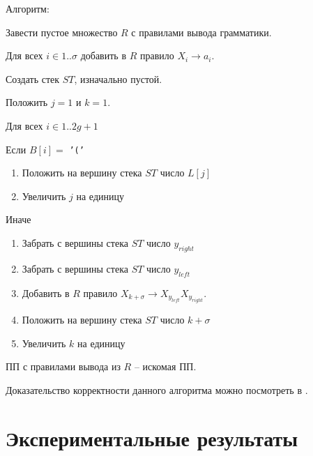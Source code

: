\documentclass[14pt]{article}
\begin{document}
{\sc Алгоритм:}
\begin{enumerate}
	\begin{item}
		Завести пустое множество $R$ с правилами вывода грамматики.
	\end{item}
	\begin{item}
		Для всех $i \in 1..\sigma$ добавить в $R$ правило $X_i \to a_i$.
	\end{item}
	\begin{item}
		Создать стек $ST$, изначально пустой.
	\end{item}
	\begin{item}
		Положить $j = 1$ и $k = 1$.
	\end{item}
	\begin{item}
		Для всех $i \in 1..2g+1$
		\begin{itemize}
			\begin{item}
	    	    Если $B[i] = $ \texttt{'('}
    	    	\begin{enumerate}
    	    		\item Положить на вершину стека $ST$ число $L[j]$
    	    		\item Увеличить $j$ на единицу
		        \end{enumerate}
        	\end{item}
        	\begin{item}
        		Иначе 
        		\begin{enumerate}
        			\item Забрать с вершины стека $ST$ число $y_{right}$
        			\item Забрать с вершины стека $ST$ число $y_{left}$
					\item Добавить в $R$ правило $X_{k+\sigma} \to X_{y_{left}}X_{y_{right}}$.
    	    		\item Положить на вершину стека $ST$ число $k+\sigma$
    	    		\item Увеличить $k$ на единицу
        		\end{enumerate}
        	\end{item}
        \end{itemize}
	\end{item}
	\begin{item}
		ПП с правилами вывода из $R$ -- искомая ПП.
	\end{item}
\end{enumerate}

Доказательство корректности данного алгоритма можно посмотреть в \cite{LCAOnlineSLP}.

\section{Экспериментальные результаты}
\label{PracticalExperiments}
\end{document}
